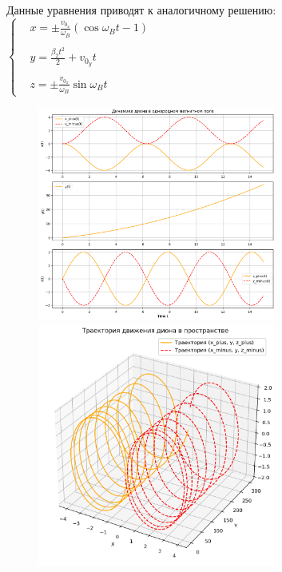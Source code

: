 \documentclass[oneside,final,14pt]{extarticle}
\begin{document}
	\vskip1.5pt
	\noindent Данные уравнения приводят к аналогичному решению: \\
	
	\begin{math}
		\left\{
		\begin{aligned}
			& x = \pm \frac{v_{0_{x}}}{\omega_{B}} (\cos{\omega_{B}t} - 1) \\\\
			& y = \frac{\beta_{2}t^{2}}{2} + v_{0_{y}}t \\\\
			& z = \pm \frac{v_{0_{x}}}{\omega_{B}} \sin{\omega_{B}t}
		\end{aligned}
		\right.
	\end{math}
	
	\begin{figure}
		\centering
		\includegraphics[width=0.7\textwidth]{dion_B.png}
		\label{fig:label1_1}
		\includegraphics[width=0.7\textwidth]{dion_B_xyz.png}
		\label{fig:label_2}
	\end{figure}
	
\end{document}
